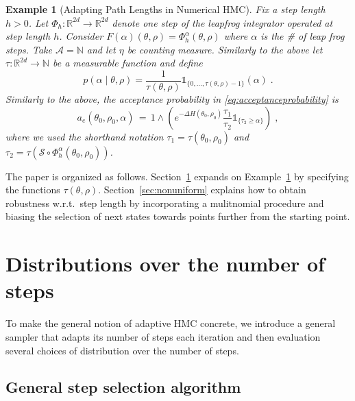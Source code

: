 \documentclass[ejs]{imsart}
\theoremstyle{plain}%
\newtheorem{example}[prototheorem]{Example}
\theoremstyle{remark}
\begin{document}
\begin{example}[Adapting Path Lengths in Numerical HMC] \label{ex:numericalHMC}
Fix a step length $h>0$.  Let $\Phi_h: \mathbb{R}^{2d} \to \mathbb{R}^{2d}$ denote one step of the leapfrog integrator operated at step length $h$.  Consider $F(\alpha)(\theta, \rho) = \Phi_h^{\alpha}(\theta, \rho)$ where $\alpha$ is the \# of leap frog steps. Take $\mathcal{A} = \mathbb{N}$ and let $\eta$ be counting measure. Similarly to the above let $\tau: \mathbb{R}^{2d} \to \mathbb{N}$ be a measurable function and define \[ p(\alpha \mid \theta, \rho) = \frac{1}{\tau(\theta, \rho)} \mathds{1}_{\{0, \dots, \tau(\theta, \rho)-1\} }(\alpha) \;.  \]
Similarly to the above, the acceptance probability in \eqref{eq:acceptanceprobability} is \[
a_e(\theta_0, \rho_0, \alpha) \, = \, 
1 \wedge \left( e^{-\Delta H(\theta_0, \rho_0)} \frac{\tau_1}{\tau_2} \mathds{1}_{\{ \tau_2 \geq \alpha \} } \right) \;, \]
where we used the shorthand notation $\tau_1 = \tau(\theta_0, \rho_0)$ and $\tau_2 = \tau(\mathcal{S} \circ \Phi^{\alpha}_h(\theta_0, \rho_0))$.
\end{example}

The paper is organized as follows. Section~\ref{sec:uniform} expands on Example~\ref{ex:numericalHMC} by specifying the functions $\tau(\theta, \rho)$.   Section~\ref{sec:nonuniform} explains how to obtain robustness w.r.t.~step length by incorporating a mulitnomial procedure and biasing the selection of next states towards points further from the starting point.  



\section{Distributions over the number of steps} \label{sec:uniform}

To make the general notion of adaptive HMC concrete, we introduce a general sampler that adapts its number of steps each iteration and then evaluation several choices of distribution over the number of steps.  

\subsection{General step selection algorithm}
\end{document}
